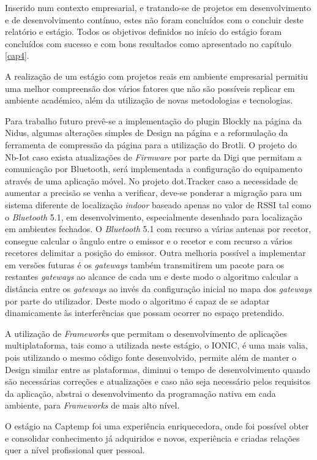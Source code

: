 \par Inserido num contexto empresarial, e tratando-se de projetos em desenvolvimento e de desenvolvimento contínuo, estes não foram concluídos com o concluir deste relatório e estágio. Todos os objetivos definidos no início do estágio foram concluídos com sucesso e com bons resultados como apresentado no capítulo \ref{cap4}. 
\par A realização de um estágio com projetos reais em ambiente empresarial permitiu uma melhor compreensão dos vários fatores que  não são possíveis replicar em ambiente académico, além da utilização de novas metodologias e tecnologias.

\par Para trabalho futuro prevê-se a implementação do plugin Blockly na página da Nidus, algumas alterações simples de Design na página e a reformulação da ferramenta de compressão da página para a utilização do Brotli.
O projeto do Nb-Iot caso exista atualizações de \textit{Firmware} por parte da Digi que permitam a comunicação por Bluetooth, será implementada a configuração do equipamento através de uma aplicação móvel. No projeto dot.Tracker caso a necessidade de aumentar a precisão se venha a verificar, deve-se ponderar a migração para um sistema diferente de localização \textit{indoor} baseado apenas no valor de RSSI tal como o \textit{Bluetooth} 5.1, em desenvolvimento, especialmente desenhado para localização em ambientes fechados. O \textit{Bluetooth} 5.1 com recurso a várias antenas por recetor, consegue calcular o ângulo entre o emissor e o recetor e com recurso a vários recetores delimitar a posição do emissor. Outra melhoria possível a implementar em versões futuras é os \textit{gateways} também transmitirem um pacote para os restantes \textit{gateways} ao alcance de cada um e deste modo o algoritmo calcular a distância entre os \textit{gateways} ao invés da configuração inicial no mapa dos \textit{gateways} por parte do utilizador. Deste modo o algoritmo é capaz de se adaptar dinamicamente às interferências que possam ocorrer no espaço pretendido.

\par A utilização de \textit{Frameworks} que permitam o desenvolvimento de aplicações multiplataforma, tais como a utilizada neste estágio, o IONIC, é uma mais valia, pois utilizando o mesmo código fonte desenvolvido, permite além de manter o Design similar entre as plataformas, diminui o tempo de desenvolvimento quando são necessárias correções e atualizações e caso não seja necessário pelos requisitos da aplicação, abstrai o desenvolvimento da programação nativa em cada ambiente, para \textit{Frameworks} de mais alto nível.

\par O estágio na Captemp foi uma experiência enriquecedora, onde foi possível obter e consolidar conhecimento já adquiridos e novos, experiência e criadas relações quer a nível profissional quer pessoal.